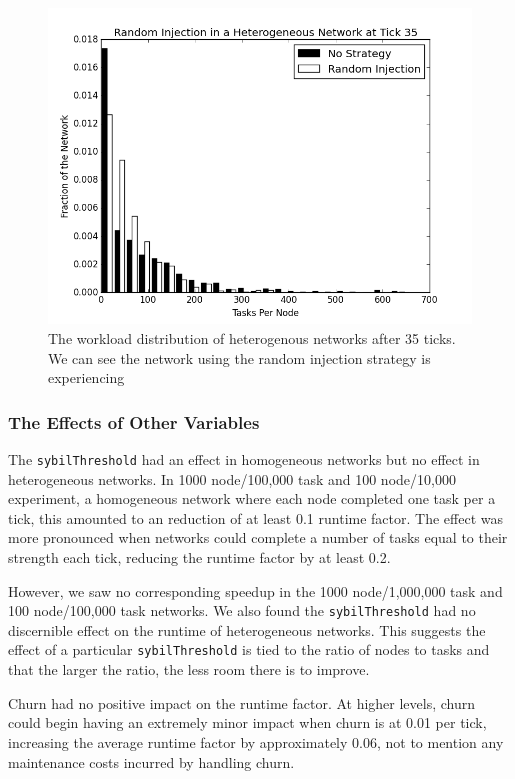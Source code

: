 \begin{figure}
\centering
\includegraphics[width=0.7\linewidth]{figs/randomStableHistHetero35}
\caption[Random injection in a Heterogenous Network]{The workload distribution of heterogenous networks after 35 ticks.  We can see the network using the random injection strategy is experiencing}
\label{fig:randomStableHistHetero35}
\end{figure}



\subsubsection{The Effects of Other Variables}

The \texttt{sybilThreshold} had an effect in homogeneous networks but no effect in heterogeneous networks.
In 1000 node/100,000 task and 100 node/10,000 experiment, a homogeneous network where each node completed one task per a tick, this amounted to an reduction of at least 0.1 runtime factor.
The effect was more pronounced when networks could complete a number of tasks equal to their strength each tick, reducing the runtime factor by at least 0.2.

However, we saw no corresponding speedup in the 1000 node/1,000,000 task and 100 node/100,000 task networks.
We also found the \texttt{sybilThreshold} had no discernible effect on the runtime of heterogeneous networks.
This suggests the effect of a particular \texttt{sybilThreshold} is tied to the ratio of nodes to tasks and that the larger the ratio, the less room there is to improve.

Churn had no positive impact on the runtime factor.
At higher levels, churn could begin having an extremely minor impact when churn is at 0.01 per tick, increasing the average runtime factor by approximately 0.06, not to mention any maintenance costs incurred by handling churn.

